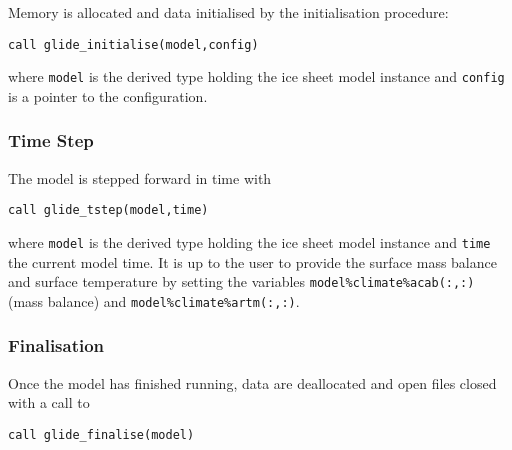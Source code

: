 Memory is allocated and data initialised by the initialisation procedure:
\begin{verbatim}
call glide_initialise(model,config)
\end{verbatim}
where \texttt{model} is the derived type holding the ice sheet model instance and \texttt{config} is a pointer to the configuration.

\subsubsection{Time Step}
The model is stepped forward in time with 
\begin{verbatim}
call glide_tstep(model,time)
\end{verbatim}
where \texttt{model} is the derived type holding the ice sheet model instance and \texttt{time} the current model time. It is up to the user to provide the surface mass balance and surface temperature by setting the variables \texttt{model\%climate\%acab(:,:)} (mass balance) and \texttt{model\%climate\%artm(:,:)}.

\subsubsection{Finalisation}
Once the model has finished running, data are deallocated and open files closed with a call to
\begin{verbatim}
call glide_finalise(model)
\end{verbatim}